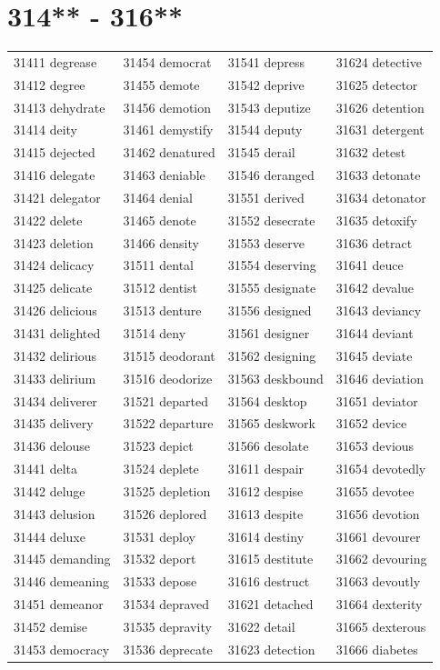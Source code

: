 \documentclass[10pt, oneside]{book}
\begin{document}
\begin{table}
	\centering
	\section*{314** - 316**}
	\begin{tabular}{l l l l}
31411 degrease &31454 democrat &31541 depress &31624 detective\\
31412 degree &31455 demote &31542 deprive &31625 detector\\
31413 dehydrate &31456 demotion &31543 deputize &31626 detention\\
31414 deity &31461 demystify &31544 deputy &31631 detergent\\
31415 dejected &31462 denatured &31545 derail &31632 detest\\
31416 delegate &31463 deniable &31546 deranged &31633 detonate\\
31421 delegator &31464 denial &31551 derived &31634 detonator\\
31422 delete &31465 denote &31552 desecrate &31635 detoxify\\
31423 deletion &31466 density &31553 deserve &31636 detract\\
31424 delicacy &31511 dental &31554 deserving &31641 deuce\\
31425 delicate &31512 dentist &31555 designate &31642 devalue\\
31426 delicious &31513 denture &31556 designed &31643 deviancy\\
31431 delighted &31514 deny &31561 designer &31644 deviant\\
31432 delirious &31515 deodorant &31562 designing &31645 deviate\\
31433 delirium &31516 deodorize &31563 deskbound &31646 deviation\\
31434 deliverer &31521 departed &31564 desktop &31651 deviator\\
31435 delivery &31522 departure &31565 deskwork &31652 device\\
31436 delouse &31523 depict &31566 desolate &31653 devious\\
31441 delta &31524 deplete &31611 despair &31654 devotedly\\
31442 deluge &31525 depletion &31612 despise &31655 devotee\\
31443 delusion &31526 deplored &31613 despite &31656 devotion\\
31444 deluxe &31531 deploy &31614 destiny &31661 devourer\\
31445 demanding &31532 deport &31615 destitute &31662 devouring\\
31446 demeaning &31533 depose &31616 destruct &31663 devoutly\\
31451 demeanor &31534 depraved &31621 detached &31664 dexterity\\
31452 demise &31535 depravity &31622 detail &31665 dexterous\\
31453 democracy &31536 deprecate &31623 detection &31666 diabetes\\
	\end{tabular}
 \end{table}
\clearpage
\end{document}
